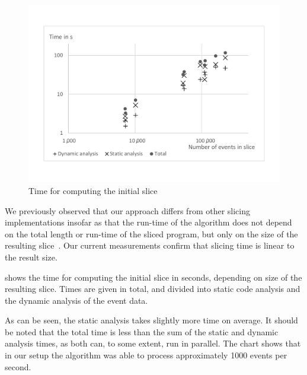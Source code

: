\begin{figure}
	\centering
		\includegraphics[width=\linewidth, clip, trim={20mm 26mm 20mm 26mm}]{img/chart-initial.pdf}
	\caption{Time for computing the initial slice}
	\label{fig:chartinitial}
\end{figure}

We previously observed that our approach differs from other slicing implementations insofar as that the run-time of the algorithm does not depend on the total length or run-time of the sliced program, but only on the size of the resulting slice~\cite{treffer14:dynamic_slicing_with_soot}.
Our current measurements confirm that slicing time is linear to the result size.

 shows the time for computing the initial slice in seconds, depending on size of the resulting slice.
Times are given in total, and divided into static code analysis and the dynamic analysis of the event data.

As can be seen, the static analysis takes slightly more time on average.
It should be noted that the total time is less than the sum of the static and dynamic analysis times, as both can, to some extent, run in parallel.
The chart shows that in our setup the algorithm was able to process approximately 1000 events per second.

